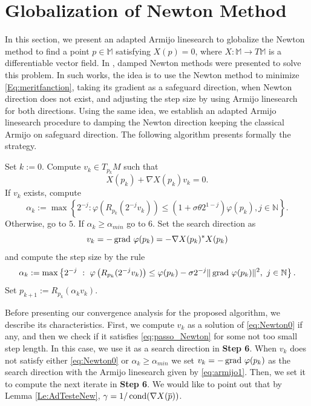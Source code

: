 \section{Globalization of Newton Method}\label{sec:DampedNewtonMethod1}
In this section, we present an adapted Armijo linesearch to globalize the Newton method to find a point $p\in\mathbb{M}$ satisfying $X(p)=0$, where $X:\mathbb{M}\to T\mathbb{M}$ is a differentiable vector field. In \cite{MR4102428,bortoloti2022efficient}, damped Newton methods were presented to solve this problem. In such works, the idea is to use the Newton method to minimize \eqref{Eq:meritfanction}, taking its gradient as a safeguard direction, when  Newton direction does not exist, and adjusting the step size by using Armijo linesearch for both directions.
Using the same idea, we establish an adapted Armijo linesearch procedure to damping the Newton direction keeping the classical Armijo on safeguard direction. The following algorithm presents formally the strategy.
\begin{algorithm}[H] \label{AL:Newton_NewLinesearch}
\DontPrintSemicolon
  \KwInput{$\sigma \in (0,1/2)$, $\theta \in [0,\gamma)$, $\alpha_{min}>0$, and $p_0 \in \mathbb{M}$.}
  Set $k := 0$.\;
  Compute $v_k \in T_{p_k}M$ such that
  \begin{equation}\label{eq:Newton0}
  X(p_k)+\nabla X(p_k)v_k=0.
  \end{equation} \;
  If  $v_k$ exists, compute
  \begin{equation}\label{eq:passo_Newton}
  \alpha_k:=\max \left\{ 2^{-j}:\varphi\left(R_{p_k}(2^{-j} v_{k})\right)\leq (1+\sigma\theta2^{1-j})\varphi\left(p_{k}\right), j\in \mathbb{N} \right\}.
  \end{equation}
  Otherwise, go to $5$. \;
  If $\alpha_k \ge \alpha_{min}$ go to $6$. \;
  Set the search direction as
  \begin{equation}\label{Eq:safeguardDirection}
    v_{k}=  -\operatorname{grad}\,\varphi(p_{k})=-\nabla X(p_{k})^{*}X(p_{k})
  \end{equation}
  and compute the step size by the rule
  \begin{equation}\label{eq:armijo1}
  \alpha_k:=\max \left\{ 2^{-j}~: ~\varphi\left(R_{p_k}(2^{-j} v_{k})\right)\leq \varphi(p_k)-\sigma 2^{-j}\| \operatorname{grad}\,\varphi(p_k)\|^{2}, ~j\in \mathbb{N} \right\}.
  \end{equation}\;
  Set $p_{k+1} := R_{p_k}(\alpha_k v_k)$.
\caption{ }
\end{algorithm}
\noindent Before presenting our convergence analysis for the proposed algorithm, we describe its characteristics. First, we compute $v_k$ as a solution of  \eqref{eq:Newton0}  if any,  and then we  check if it satisfies \eqref{eq:passo_Newton} for some not too small step length. In this case, we use it as a search direction in {\bf Step 6}. When $v_k$ does not satisfy either \eqref{eq:Newton0} or $\alpha_k\geq\alpha_{min}$ we set $v_{k}=  -\operatorname{grad}\,\varphi(p_{k})$ as the search direction with the Armijo linesearch given by \eqref{eq:armijo1}. Then, we set it to compute the next iterate in {\bf Step 6}. We would like to point out that by Lemma \ref{Le:AdTesteNew}, $\gamma=1/\operatorname{cond} (\nabla X(\overline{p}))$. 

